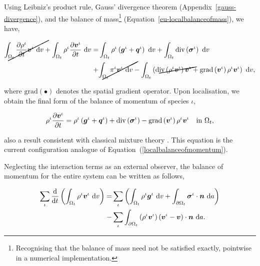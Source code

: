 \noindent Using Leibniz's product rule, Gauss' divergence theorem
(Appendix~\ref{gauss-divergence}), and the balance of
mass{\footnote{Recognising that the balance of mass need not be
    satisfied exactly, pointwise in a numerical implementation.}}
(Equation~\ref{eu-localbalanceofmass}), we have,

\begin{equation*}
\begin{split}
\cancel{\int_{\Omega_{t}} \frac{\partial \rho^{\iota}} {\partial t}
  \bv^{\iota} \ \mathrm{d}v} + \int_{\Omega_{t}} \rho^{\iota}
\frac{\partial \bv^{\iota}} {\partial t} \ \mathrm{d}v = &
\int_{\Omega_{t}} \rho^{\iota} \left(\bg^{\iota}+\bq^{\iota}\right)
\ \mathrm{d}v + \int_{\Omega_{t}}
\mathrm{div}\left(\Bsigma^{\iota}\right)\ \mathrm{d}v\\ + &
\cancel{\int_{\Omega_{t}} \pi^{\iota}\bv^{\iota} \ \mathrm{d}v} -
\int_{\Omega_{t}}\left(\cancel{\mathrm{div}
  \left(\rho^{\iota}\bv^{\iota}\right) \bv^{\iota}} +
\mathrm{grad}\left(\bv^{\iota}\right)
\rho^{\iota}\bv^{\iota}\right)\ \mathrm{d}v,
\end{split}
\end{equation*}

\noindent where $\mathrm{grad} (\bullet)$ denotes the spatial gradient
operator. Upon localisation, we obtain the final form of the balance
of momentum of species $\iota$,

\begin{equation}
\rho^{\iota} \frac{\partial \mbox{\boldmath$ v$}^{\iota}} {\partial t} = \rho^{\iota}
\left(\mbox{\boldmath$ g$}^{\iota}+\mbox{\boldmath$ q$}^{\iota}\right) +
\mathrm{div}\left(\mbox{\boldmath$\sigma$}^{\iota}\right) -
\mathrm{grad}\left(\mbox{\boldmath$ v$}^{\iota}\right) \rho^{\iota}\mbox{\boldmath$ v$}^{\iota} \quad
\mathrm{in}\ \Omega_{t},
\label{eu-localbalanceofmomentum}
\end{equation}

\noindent also a result consistent with classical mixture theory
\citep{TruesdellToupin:60}. This equation is the current configuration
analogue of Equation~(\ref{localbalanceofmomentum}).

Neglecting the interaction terms as an external observer, the balance
of momentum for the entire system can be written as follows,

\begin{equation}
\begin{split}
\sum\limits_{\iota} \frac{\mathrm{d}}{\mathrm{d}t}\left(\int_{\Omega_{t}} \rho^{\iota}
\mbox{\boldmath$ v$}^{\iota} \ \mathrm{d}v 
\right) = & \sum\limits_{\iota} \left(\int_{\Omega_{t}} \rho^{\iota}
\mbox{\boldmath$ g$}^{\iota} \ \mathrm{d}v + \int_{\partial \Omega_{t}} 
\mbox{\boldmath$\sigma$}^{\iota}\cdot\mbox{\boldmath$ n$}\ \mathrm{d}a\right)\\
- &\sum\limits_{\iota}\int_{\partial \Omega_{t}} \left(\rho^{\iota}
  \mbox{\boldmath$ v$}^{\iota} \right) \left(\mbox{\boldmath$ v$}^{\iota} -
\mbox{\boldmath$ v$}\right) \cdot \mbox{\boldmath$ n$}\ \mathrm{d}a.
\end{split}
\label{eu-systembalanceofmomentum}
\end{equation}

